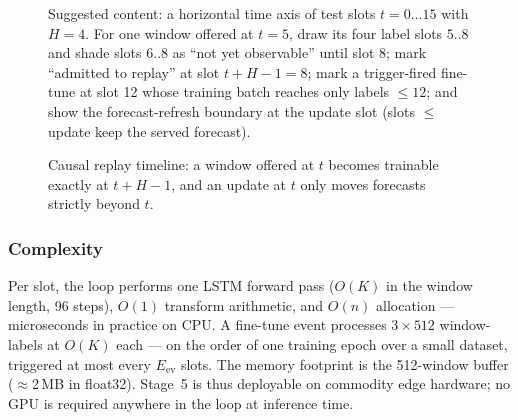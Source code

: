 \begin{figure}[!t]
\centering
{}
{Suggested content: a horizontal time axis of test slots $t = 0
\dots 15$ with $H = 4$. For one window offered at $t = 5$, draw its
four label slots $5..8$ and shade slots $6..8$ as ``not yet
observable'' until slot 8; mark ``admitted to replay'' at slot
$t + H - 1 = 8$; mark a trigger-fired fine-tune at slot 12 whose
training batch reaches only labels $\le 12$; and show the
forecast-refresh boundary at the update slot (slots $\le$ update
keep the served forecast).}
\caption{Causal replay timeline: a window offered at $t$ becomes
trainable exactly at $t + H - 1$, and an update at $t$ only moves
forecasts strictly beyond $t$.}
\label{fig:causal-timeline}
\end{figure}

\subsubsection{Complexity}

Per slot, the loop performs one LSTM forward pass
($O(K)$ in the window length, 96 steps), $O(1)$ transform
arithmetic, and $O(n)$ allocation --- microseconds in practice on
CPU. A fine-tune event processes $3 \times 512$ window-labels at
$O(K)$ each --- on the order of one training epoch over a small
dataset, triggered at most every $E_{\text{ev}}$ slots. The memory
footprint is the 512-window buffer ($\approx$2\,MB in float32).
Stage~5 is thus deployable on commodity edge hardware; no GPU is
required anywhere in the loop at inference time.
